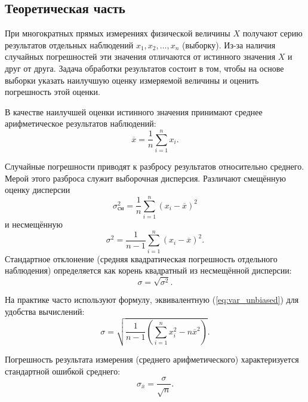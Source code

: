 \subsection{Теоретическая часть}

При многократных прямых измерениях физической величины \(X\) получают серию результатов отдельных наблюдений \(x_1, x_2, \dots, x_n\) (выборку). Из-за наличия случайных погрешностей эти значения отличаются от истинного значения \(X\) и друг от друга. Задача обработки результатов состоит в том, чтобы на основе выборки указать наилучшую оценку измеряемой величины и оценить погрешность этой оценки.

В качестве наилучшей оценки истинного значения принимают среднее арифметическое результатов наблюдений:
\begin{equation}
\overline{x} = \frac{1}{n}\sum_{i=1}^{n} x_i. \label{eq:mean}
\end{equation}

Случайные погрешности приводят к разбросу результатов относительно среднего. Мерой этого разброса служит выборочная дисперсия. Различают смещённую оценку дисперсии
\begin{equation}
\sigma_{\text{см}}^2 = \frac{1}{n}\sum_{i=1}^{n} (x_i - \overline{x})^2 \label{eq:var_biased}
\end{equation}
и несмещённую
\begin{equation}
\sigma^2 = \frac{1}{n-1}\sum_{i=1}^{n} (x_i - \overline{x})^2. \label{eq:var_unbiased}
\end{equation}
Стандартное отклонение (средняя квадратическая погрешность отдельного наблюдения) определяется как корень квадратный из несмещённой дисперсии:
\begin{equation}
\sigma = \sqrt{\sigma^2}. \label{eq:std}
\end{equation}

На практике часто используют формулу, эквивалентную (\ref{eq:var_unbiased}) для удобства вычислений:
\begin{equation}
\sigma = \sqrt{\frac{1}{n-1}\left( \sum_{i=1}^{n} x_i^2 - n\overline{x}^2 \right)}. \label{eq:std_calc}
\end{equation}

Погрешность результата измерения (среднего арифметического) характеризуется стандартной ошибкой среднего:
\begin{equation}
\sigma_{\overline{x}} = \frac{\sigma}{\sqrt{n}}. \label{eq:stderr}
\end{equation}

